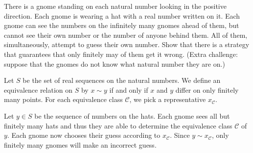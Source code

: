 \begin{problem}
        \begin{statement}
                There is a gnome standing on each natural number looking in the positive direction. Each gnome is wearing a hat with a real number written on it. Each gnome can see the numbers on the infinitely many gnomes ahead of them, but cannot see their own number or the number of anyone behind them. All of them, simultaneously, attempt to guess their own number. Show that there is a strategy that guarantees that only finitely may of them get it wrong. (Extra challenge: suppose that the gnomes do not know what natural number they are on.)
        \end{statement}
	\begin{solution}
		Let $S$ be the set of real sequences on the natural numbers. We define an equivalence relation on $S$ by $x\sim y$ if and only if $x$ and $y$ differ on  only finitely many points. For each equivalence class $\mathcal C$, we pick a representative $x_{\mathcal C}$.

		Let $y\in S$ be the sequence of numbers on the hats. Each gnome sees all but finitely many hats and thus they are able to determine the equivalence class $\mathcal C$ of $y$. Each gnome now chooses their guess according to $x_{\mathcal C}$. Since $y\sim x_{\mathcal C}$, only finitely many gnomes will make an incorrect guess.
	\end{solution}
\end{problem}


